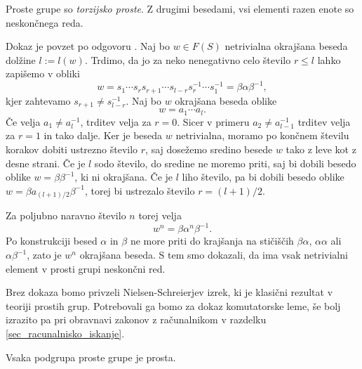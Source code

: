 \begin{trditev}\label{trd_prosta_grupa_je_torzijsko_prosta}
    Proste grupe so \emph{torzijsko proste}. Z drugimi besedami, vsi elementi razen enote so neskončnega reda. 
\end{trditev}
\begin{dokaz}
Dokaz je povzet po odgovoru \cite{math_stack_2207776_torsion_free}.
Naj bo $w \in F(S)$ netrivialna okrajšana beseda dolžine $l := l(w)$. Trdimo, da jo za neko nenegativno celo število $r \le l$ lahko zapišemo v obliki \begin{equation*}
w = s_1 \cdots  s_r s_{r + 1} \cdots s_{l -r} s_{r}^{-1} \cdots s_1^{-1} = \beta \alpha \beta^{-1}, 
\end{equation*}  
kjer zahtevamo $s_{r + 1} \neq s_{l - r}^{-1}$. Naj bo $w$ okrajšana beseda oblike \begin{equation*}
w = a_1 \cdots  a_l.
\end{equation*}  
Če velja $a_1 \neq a_l^{-1}$, trditev velja za $r = 0$. Sicer v primeru $a_2 \neq a_{l - 1}^{-1}$ trditev velja za $r = 1$ in tako dalje. Ker je beseda $w$ netrivialna, moramo po končnem številu korakov dobiti ustrezno število $r$, saj dosežemo sredino besede $w$ tako z leve kot z desne strani. Če je $l$ sodo število, do sredine ne moremo priti, saj bi dobili besedo oblike
$w = \beta \beta^{-1}$, ki ni okrajšana. Če je $l$ liho število, pa bi dobili besedo oblike $w = \beta a_{(l + 1) / 2}  \beta^{-1}$, torej bi ustrezalo število $r = (l + 1) / 2$.

Za poljubno naravno število $n$ torej velja \begin{equation*}
w^{n} = \beta \alpha^{n} \beta^{-1}.
\end{equation*}  
  Po konstrukciji besed $\alpha$ in $\beta$ ne more priti do krajšanja na stičiščih $\beta \alpha$, $\alpha \alpha$ ali $\alpha \beta^{-1}$, zato je $w^{n}$ okrajšana beseda.
  S tem smo dokazali, da ima vsak netrivialni element v prosti grupi neskončni red.
\end{dokaz}

Brez dokaza bomo privzeli Nielsen-Schreierjev izrek, ki je klasični rezultat v teoriji prostih grup. Potrebovali ga bomo za dokaz komutatorske leme,
še bolj izrazito pa pri obravnavi zakonov z računalnikom v razdelku \ref{sec_racunalnisko_iskanje}. 

\begin{izrek}
\label{izr_nielsen_schreier}
 Vsaka podgrupa proste grupe je prosta.
\end{izrek}

